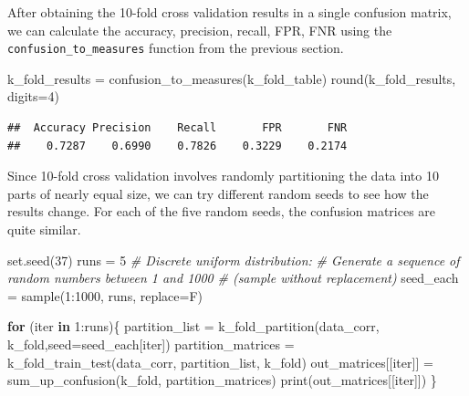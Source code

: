 \documentclass[
]{article}
\newenvironment{Shaded}{\begin{snugshade}}{\end{snugshade}}
\newcommand{\AttributeTok}[1]{\textcolor[rgb]{0.77,0.63,0.00}{#1}}
\newcommand{\CommentTok}[1]{\textcolor[rgb]{0.56,0.35,0.01}{\textit{#1}}}
\newcommand{\ControlFlowTok}[1]{\textcolor[rgb]{0.13,0.29,0.53}{\textbf{#1}}}
\newcommand{\DecValTok}[1]{\textcolor[rgb]{0.00,0.00,0.81}{#1}}
\newcommand{\FunctionTok}[1]{\textcolor[rgb]{0.00,0.00,0.00}{#1}}
\newcommand{\NormalTok}[1]{#1}
\newcommand{\OtherTok}[1]{\textcolor[rgb]{0.56,0.35,0.01}{#1}}
\newcommand{\SpecialCharTok}[1]{\textcolor[rgb]{0.00,0.00,0.00}{#1}}
\begin{document}
After obtaining the 10-fold cross validation results in a single
confusion matrix, we can calculate the accuracy, precision, recall, FPR,
FNR using the \texttt{confusion\_to\_measures} function from the
previous section.

\begin{Shaded}
\begin{Highlighting}[]
\NormalTok{k\_fold\_results }\OtherTok{=} \FunctionTok{confusion\_to\_measures}\NormalTok{(k\_fold\_table)}
\FunctionTok{round}\NormalTok{(k\_fold\_results, }\AttributeTok{digits=}\DecValTok{4}\NormalTok{)}
\end{Highlighting}
\end{Shaded}

\begin{verbatim}
##  Accuracy Precision    Recall       FPR       FNR 
##    0.7287    0.6990    0.7826    0.3229    0.2174
\end{verbatim}

Since 10-fold cross validation involves randomly partitioning the data
into 10 parts of nearly equal size, we can try different random seeds to
see how the results change. For each of the five random seeds, the
confusion matrices are quite similar.

\begin{Shaded}
\begin{Highlighting}[]
\FunctionTok{set.seed}\NormalTok{(}\DecValTok{37}\NormalTok{)}
\NormalTok{runs }\OtherTok{=} \DecValTok{5}
\CommentTok{\# Discrete uniform distribution:}
\CommentTok{\# Generate a sequence of random numbers between 1 and 1000}
\CommentTok{\# (sample without replacement)}
\NormalTok{seed\_each }\OtherTok{=} \FunctionTok{sample}\NormalTok{(}\DecValTok{1}\SpecialCharTok{:}\DecValTok{1000}\NormalTok{, runs, }\AttributeTok{replace=}\NormalTok{F)}

\ControlFlowTok{for}\NormalTok{ (iter }\ControlFlowTok{in} \DecValTok{1}\SpecialCharTok{:}\NormalTok{runs)\{}
\NormalTok{  partition\_list }\OtherTok{=} \FunctionTok{k\_fold\_partition}\NormalTok{(data\_corr, k\_fold,}\AttributeTok{seed=}\NormalTok{seed\_each[iter])}
\NormalTok{  partition\_matrices }\OtherTok{=} \FunctionTok{k\_fold\_train\_test}\NormalTok{(data\_corr, partition\_list, k\_fold)}
\NormalTok{  out\_matrices[[iter]] }\OtherTok{=} \FunctionTok{sum\_up\_confusion}\NormalTok{(k\_fold, partition\_matrices)}
  \FunctionTok{print}\NormalTok{(out\_matrices[[iter]])}
\NormalTok{\}}
\end{Highlighting}
\end{Shaded}
\end{document}

